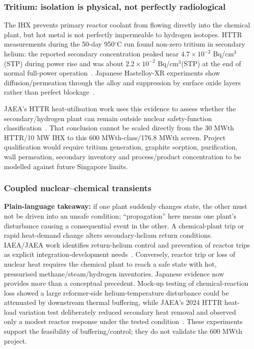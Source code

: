 \subsubsection{Tritium: isolation is physical, not perfectly radiological}
The IHX prevents primary reactor coolant from flowing directly into the chemical plant, but hot metal is not perfectly impermeable to hydrogen isotopes.  HTTR measurements during the 50-day 950$^\circ$C run found non-zero tritium in secondary helium: the reported secondary concentration peaked near $4.7\times10^{-2}$ Bq/cm$^3$(STP) during power rise and was about $2.2\times10^{-2}$ Bq/cm$^3$(STP) at the end of normal full-power operation~\cite{dipu2016tritium}.  Japanese Hastelloy-XR experiments show diffusion/permeation through the alloy and suppression by surface oxide layers rather than perfect blockage~\cite{takeda2000permeation}.

JAEA's HTTR heat-utilisation work uses this evidence to assess whether the secondary/hydrogen plant can remain outside nuclear safety-function classification~\cite{jaea2026heatuse}.  That conclusion cannot be scaled directly from the 30 MWth HTTR/10 MW IHX to this 600 MWth-class/176.8 MWth screen.  Project qualification would require tritium generation, graphite sorption, purification, wall permeation, secondary inventory and process/product concentration to be modelled against future Singapore limits.

\subsubsection{Coupled nuclear--chemical transients}
\textbf{Plain-language takeaway:} if one plant suddenly changes state, the other must not be driven into an unsafe condition; ``propagation'' here means one plant's disturbance causing a consequential event in the other. A chemical-plant trip or rapid heat-demand change alters secondary-helium return conditions. IAEA/JAEA work identifies return-helium control and prevention of reactor trips as explicit integration-development needs~\cite{iaeacoupling2009}. Conversely, reactor trip or loss of nuclear heat requires the chemical plant to reach a safe state with hot, pressurised methane/steam/hydrogen inventories. Japanese evidence now provides more than a conceptual precedent.  Mock-up testing of chemical-reaction loss showed a large reformer-side helium-temperature disturbance could be attenuated by downstream thermal buffering, while JAEA's 2024 HTTR heat-load variation test deliberately reduced secondary heat removal and observed only a modest reactor response under the tested condition~\cite{jaea2024heatload}.  These experiments support the feasibility of buffering/control; they do not validate the 600 MWth project.

